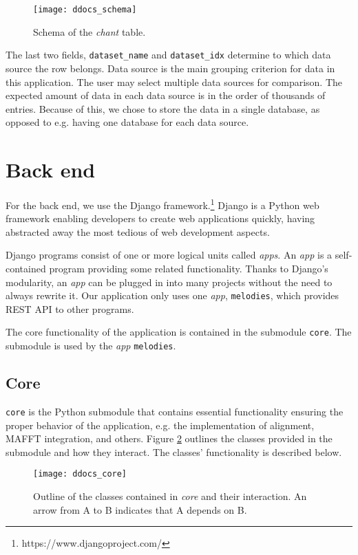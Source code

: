 \begin{figure}[!h]
\centering
\texttt{[image: ddocs\_schema]}
\caption{Schema of the \emph{chant} table.}
\label{fig:schema}
\end{figure}

The last two fields, \verb|dataset_name| and \verb|dataset_idx| determine to which data source the row belongs. Data source is the main grouping criterion
for data in this application. The user may select multiple data sources for comparison. The expected amount of data in each data source is in the order
of thousands of entries. Because of this, we chose to store the data in a single database, as opposed to e.g. having one database for each data source.

\section{Back end}

For the back end, we use the Django framework.\footnote{https://www.djangoproject.com/} Django is a Python web framework enabling developers to create web
applications quickly, having abstracted away the most tedious of web development aspects.

Django programs consist of one or more logical units called \emph{apps}. An \emph{app} is a self-contained program providing some related functionality. Thanks
to Django's modularity, an \emph{app} can be plugged in into many projects without the need to always rewrite it. Our application only uses one \emph{app},
\verb|melodies|, which provides REST API to other programs.

The core functionality of the application is contained in the submodule \verb|core|. The submodule is used by the \emph{app} \verb|melodies|.

\subsection{Core}

\verb|core| is the Python submodule that contains essential functionality ensuring the proper behavior of the application, e.g. the implementation of alignment,
MAFFT integration, and others. Figure \ref{fig:core} outlines the classes provided in the submodule and how they interact. The classes' functionality
is described below.

\begin{figure}[!h]
\centering
\texttt{[image: ddocs\_core]}
\caption{Outline of the classes contained in \emph{core} and their interaction. An arrow from A to B indicates that A depends on B.}
\label{fig:core}
\end{figure}

